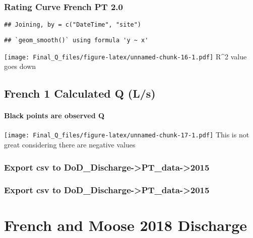 \documentclass[
]{article}
\begin{document}
\hypertarget{rating-curve-french-pt-2.0}{%
\subsubsection{Rating Curve French PT
2.0}\label{rating-curve-french-pt-2.0}}

\begin{verbatim}
## Joining, by = c("DateTime", "site")
\end{verbatim}

\begin{verbatim}
## `geom_smooth()` using formula 'y ~ x'
\end{verbatim}

\texttt{[image: Final\_Q\_files/figure-latex/unnamed-chunk-16-1.pdf]}
R\^{}2 value goes down

\hypertarget{french-1-calculated-q-ls}{%
\subsection{French 1 Calculated Q
(L/s)}\label{french-1-calculated-q-ls}}

\hypertarget{black-points-are-observed-q-1}{%
\paragraph{Black points are observed
Q}\label{black-points-are-observed-q-1}}

\texttt{[image: Final\_Q\_files/figure-latex/unnamed-chunk-17-1.pdf]} This
is not great considering there are negative values

\hypertarget{export-csv-to-dod_discharge-pt_data-2015-3}{%
\subsubsection{Export csv to
DoD\_Discharge-\textgreater PT\_data-\textgreater2015}\label{export-csv-to-dod_discharge-pt_data-2015-3}}

\hypertarget{export-csv-to-dod_discharge-pt_data-2015-4}{%
\subsubsection{Export csv to
DoD\_Discharge-\textgreater PT\_data-\textgreater2015}\label{export-csv-to-dod_discharge-pt_data-2015-4}}

\hypertarget{french-and-moose-2018-discharge}{%
\section{French and Moose 2018
Discharge}\label{french-and-moose-2018-discharge}}
\end{document}
